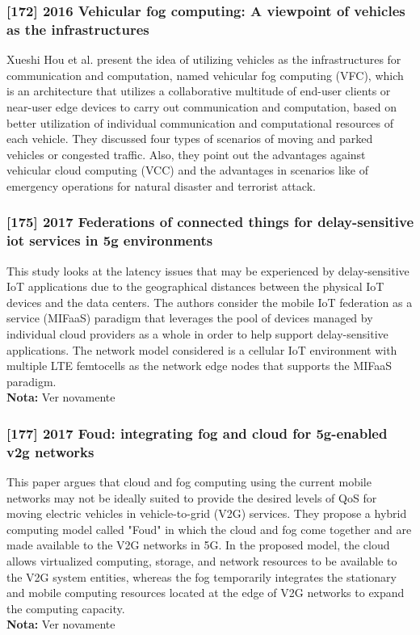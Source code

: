 \subsubsection{[172] 2016 Vehicular fog computing: A viewpoint of vehicles as the infrastructures}
\label{subsec:paper05}
Xueshi Hou et al. \cite{hou2016vehicular} present the idea of utilizing vehicles as the infrastructures for communication and computation, named vehicular fog computing (VFC), which is an architecture that utilizes a collaborative multitude of end-user clients or near-user edge devices to carry out communication and computation, based on better utilization of individual communication and computational resources of each vehicle. They discussed four types of scenarios of moving and parked vehicles or congested traffic. Also, they point out the advantages against vehicular cloud computing (VCC) and the advantages in scenarios like of emergency operations for natural disaster and terrorist attack.

\subsubsection{[175] 2017 Federations of connected things for delay-sensitive iot services in 5g environments}
This study looks at the latency issues that may be experienced by delay-sensitive IoT applications due to the geographical distances between the physical IoT devices and the data centers. The authors consider the mobile IoT federation as a service (MIFaaS) paradigm that leverages the pool of devices managed by individual cloud providers as a whole in order to help support delay-sensitive applications. The network model considered is a cellular IoT environment with multiple LTE femtocells as the network edge nodes that supports the MIFaaS paradigm.\\
\textbf{Nota:} Ver novamente

\subsubsection{[177] 2017 Foud: integrating fog and cloud for 5g-enabled v2g networks}
This paper argues that cloud and fog computing using the current mobile networks may not be ideally suited to provide the desired levels of QoS for moving electric vehicles in vehicle-to-grid (V2G) services. They propose a hybrid computing model called "Foud" in which the cloud and fog come together and are made available to the V2G networks in 5G. In the proposed model, the cloud allows virtualized computing, storage, and network resources to be available to the V2G system entities, whereas the fog temporarily integrates the stationary and mobile computing resources located at the edge of V2G networks to expand the computing capacity.\\
\textbf{Nota:} Ver novamente

